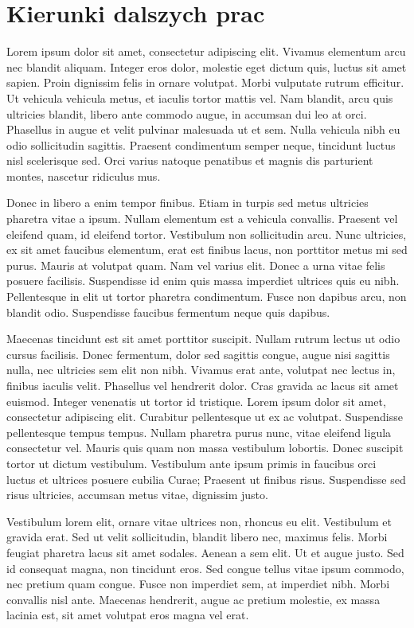 \chapter{Kierunki dalszych prac} 
Lorem ipsum dolor sit amet, consectetur adipiscing elit. Vivamus elementum arcu nec blandit aliquam. Integer eros dolor, molestie eget dictum quis, luctus sit amet sapien. Proin dignissim felis in ornare volutpat. Morbi vulputate rutrum efficitur. Ut vehicula vehicula metus, et iaculis tortor mattis vel. Nam blandit, arcu quis ultricies blandit, libero ante commodo augue, in accumsan dui leo at orci. Phasellus in augue et velit pulvinar malesuada ut et sem. Nulla vehicula nibh eu odio sollicitudin sagittis. Praesent condimentum semper neque, tincidunt luctus nisl scelerisque sed. Orci varius natoque penatibus et magnis dis parturient montes, nascetur ridiculus mus.

Donec in libero a enim tempor finibus. Etiam in turpis sed metus ultricies pharetra vitae a ipsum. Nullam elementum est a vehicula convallis. Praesent vel eleifend quam, id eleifend tortor. Vestibulum non sollicitudin arcu. Nunc ultricies, ex sit amet faucibus elementum, erat est finibus lacus, non porttitor metus mi sed purus. Mauris at volutpat quam. Nam vel varius elit. Donec a urna vitae felis posuere facilisis. Suspendisse id enim quis massa imperdiet ultrices quis eu nibh. Pellentesque in elit ut tortor pharetra condimentum. Fusce non dapibus arcu, non blandit odio. Suspendisse faucibus fermentum neque quis dapibus.

Maecenas tincidunt est sit amet porttitor suscipit. Nullam rutrum lectus ut odio cursus facilisis. Donec fermentum, dolor sed sagittis congue, augue nisi sagittis nulla, nec ultricies sem elit non nibh. Vivamus erat ante, volutpat nec lectus in, finibus iaculis velit. Phasellus vel hendrerit dolor. Cras gravida ac lacus sit amet euismod. Integer venenatis ut tortor id tristique. Lorem ipsum dolor sit amet, consectetur adipiscing elit. Curabitur pellentesque ut ex ac volutpat. Suspendisse pellentesque tempus tempus. Nullam pharetra purus nunc, vitae eleifend ligula consectetur vel. Mauris quis quam non massa vestibulum lobortis. Donec suscipit tortor ut dictum vestibulum. Vestibulum ante ipsum primis in faucibus orci luctus et ultrices posuere cubilia Curae; Praesent ut finibus risus. Suspendisse sed risus ultricies, accumsan metus vitae, dignissim justo.

Vestibulum lorem elit, ornare vitae ultrices non, rhoncus eu elit. Vestibulum et gravida erat. Sed ut velit sollicitudin, blandit libero nec, maximus felis. Morbi feugiat pharetra lacus sit amet sodales. Aenean a sem elit. Ut et augue justo. Sed id consequat magna, non tincidunt eros. Sed congue tellus vitae ipsum commodo, nec pretium quam congue. Fusce non imperdiet sem, at imperdiet nibh. Morbi convallis nisl ante. Maecenas hendrerit, augue ac pretium molestie, ex massa lacinia est, sit amet volutpat eros magna vel erat.

